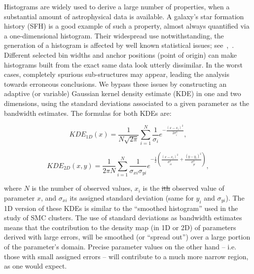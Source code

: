 \documentclass[draft]{aa}
\providecommand{\DIFaddtex}[1]{{\protect\color{blue}\uwave{#1}}} %
\providecommand{\DIFdeltex}[1]{{\protect\color{red}\sout{#1}}}                      %
\providecommand{\DIFaddbegin}{} %
\providecommand{\DIFaddend}{} %
\providecommand{\DIFdelbegin}{} %
\providecommand{\DIFdelend}{} %
\providecommand{\DIFadd}[1]{\texorpdfstring{\DIFaddtex{#1}}{#1}} %
\providecommand{\DIFdel}[1]{\texorpdfstring{\DIFdeltex{#1}}{}} %
\begin{document}
\DIFaddend Histograms are widely used to derive a large number of properties, when a
substantial amount of astrophysical data is available. A galaxy's star
formation history (SFH) is a good example of such a property, almost always
quantified via a one-dimensional histogram.
%
Their widespread use notwithstanding, the generation of a histogram is affected
by well known statistical issues;
see~\cite{Silverman_1986},~\cite{Simonoff_1997}. Different selected bin widths
and anchor positions (point of origin) can make histograms built
from the exact same data look utterly dissimilar. In the worst cases, completely
spurious sub-structures may appear, leading the analysis towards erroneous
conclusions.
%
We bypass these issues by constructing an adaptive (or variable) Gaussian kernel
density estimate (KDE) in one and two dimensions, using the standard deviations
associated to a given parameter as the bandwidth estimates. The formulas for
both KDEs are:

\begin{equation}
KDE_{1D}(x) = \frac{1}{N\sqrt{2\pi}} \sum_{i=1}^N \frac{1}{\sigma_i}
e^{-\frac{(x-x_i)^2}{2\sigma_i^2}},
\label{eq:kde-1d}
\end{equation}

\begin{equation}
KDE_{2D}(x,y) = \frac{1}{2\pi N} \sum_{i=1}^N \frac{1}{\sigma_{xi}\sigma_{yi}}
e^{-\frac{1}{2} \left( \frac{(x-x_i)^2}{\sigma_{xi}^2} + 
\frac{(y-y_i)^2}{\sigma_{yi}^2} \right)},
\label{eq:kde-2d}
\end{equation}

\noindent where $N$ is the number of observed values, $x_i$ is the \DIFdelbegin \DIFdel{ith }\DIFdelend \DIFaddbegin \DIFadd{$ith$
}\DIFaddend observed value of parameter $x$, and $\sigma_{xi}$ its assigned standard
deviation (same for $y_i$ and $\sigma_{yi}$). The 1D version of these KDEs is
similar to the ``smoothed histogram'' used in the~\cite{Rafelski_2005} study of
SMC clusters.
%
The use of standard deviations as bandwidth estimates means that the
contribution to the density map (in 1D or 2D) of parameters derived with large
errors, will be smoothed (or ``spread out'') over a large portion of the
parameter's domain. Precise parameter values on the other hand -- i.e. those
with small assigned errors -- will contribute to a much more narrow region, as
one would expect.
\end{document}

